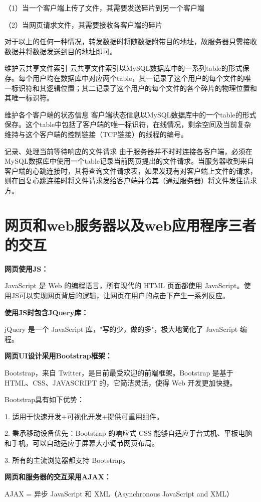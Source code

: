 （1）当一个客户端上传了文件，其需要发送碎片到另一个客户端

（2）当网页请求文件，其需要接收各客户端的碎片

对于以上的任何一种情况，转发数据时将随数据附带目的地址，故服务器只需接收数据并将数据发送到目的地址即可。

维护云共享文件索引
云共享文件索引以MySQL数据库中的一系列table的形式保存。每个用户均在数据库中对应两个table，其一记录了这个用户的每个文件的唯一标识符和其逻辑位置；其二记录了这个用户的每个文件的各个碎片的物理位置和其唯一标识符。

维护各个客户端的状态信息
客户端状态信息以MySQL数据库中的一个table的形式保存。这个table中包括了客户端的唯一标识符，在线情况，剩余空间及当前复杂维持与这个客户端的控制链接（TCP链接）的线程的编号。

记录、处理当前等待响应的文件请求
由于服务器并不时时连接各客户端，必须在MySQL数据库中使用一个table记录当前网页提出的文件请求。当服务器收到来自客户端的心跳连接时，其将查询文件请求表，如果发现有对客户端上文件的请求，则在回复心跳连接时将文件请求发给客户端并令其（通过服务器）将文件发往请求方。

\section{网页和web服务器以及web应用程序三者的交互}

\textbf{网页使用JS：}

JavaScript 是 Web 的编程语言，所有现代的 HTML 页面都使用 JavaScript。使用JS可以实现网页背后的逻辑，让网页在用户的点击下产生一系列反应。

\textbf{使用JS时包含JQuery库：}

jQuery 是一个 JavaScript 库，"写的少，做的多"，极大地简化了 JavaScript 编程。

\textbf{网页UI设计采用Bootstrap框架：}

Bootstrap，来自 Twitter，是目前最受欢迎的前端框架。Bootstrap 是基于 HTML、CSS、JAVASCRIPT 的，它简洁灵活，使得 Web 开发更加快捷。

Bootstrap具有如下优势：

1.  适用于快速开发+可视化开发+提供可重用组件。

2.  秉承移动设备优先：Bootstrap 的响应式 CSS 能够自适应于台式机、平板电脑和手机，可以自动适应于屏幕大小调节网页布局。

3.  所有的主流浏览器都支持 Bootstrap。

\textbf{网页和服务器的交互采用AJAX：}

AJAX = 异步 JavaScript 和 XML（Asynchronous JavaScript and XML）


